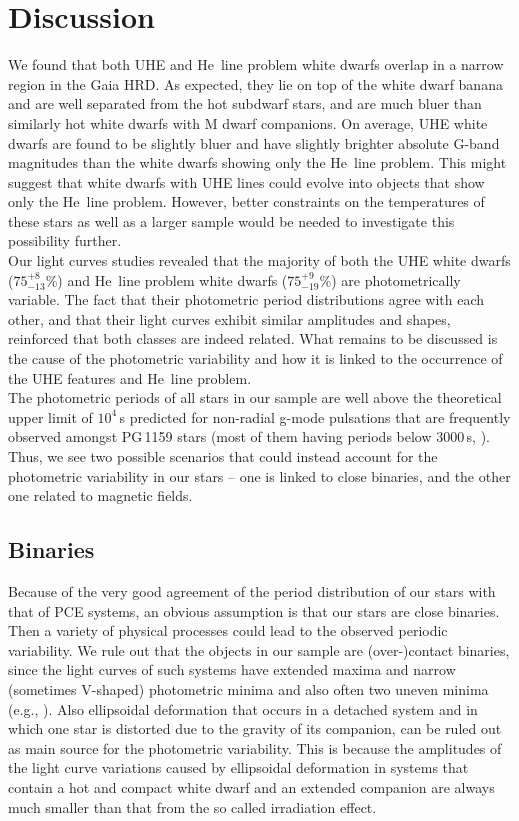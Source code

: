 \documentclass{aa}
\newcounter{Rco}
\newcommand{\Ionst}[1]{\setcounter{Rco}{#1}\Roman{Rco}}
\newcommand{\Ion}[2]{\mbox{#1\,{\scriptsize\Ionst{#2}}}}
\begin{document}
\section{Discussion}
\label{sect:discussion}
 
We found that both UHE and \Ion{He}{2} line problem white dwarfs
overlap in a narrow region in the Gaia HRD. As expected, they lie
on top of the white dwarf banana and are well separated from the
hot subdwarf stars, and are much bluer than similarly hot white dwarfs
with M dwarf companions.
On average, UHE white dwarfs are found to be slightly bluer and have slightly
brighter absolute G-band magnitudes than the white dwarfs showing only the
\Ion{He}{2} line problem. This might suggest that white dwarfs with UHE lines
could evolve into objects that show only the \Ion{He}{2} line problem.
However, better constraints on the temperatures of these stars as well as a
larger sample would be needed to investigate this possibility further.\\
Our light curves studies revealed that the majority of both the UHE
white dwarfs ($75^{+8}_{-13}$\%) and \Ion{He}{2} line problem white dwarfs
($75^{+9}_{-19}$\%) are photometrically variable. The fact that their
photometric period distributions agree with each other, and that their light curves
exhibit similar amplitudes and shapes, reinforced that both classes
are indeed related. What remains to be discussed is the cause of the
photometric variability and how it is linked to the occurrence of the
UHE features and \Ion{He}{2} line problem.\\
The photometric periods of all stars in our sample are well above the
theoretical upper limit of $10^4$\,s predicted for non-radial g-mode
pulsations that are frequently observed amongst PG\,1159 stars (most
of them having periods below 3000\,s,
\citealt{Quirion+2007, Corsico+2019, Corsico+2020}).
Thus, we see two possible scenarios that could instead account
for the photometric variability in our stars -- one is linked to close
binaries, and the other one related to magnetic fields.
 
\subsection{Binaries}
\label{sect:binaries}
 
Because of the very good agreement of the period distribution of
our stars with that of PCE systems, an obvious assumption is that
our stars are close binaries. Then a variety of physical processes
could lead to the observed periodic variability. We rule out that the
objects in our sample are (over-)contact binaries, since the light curves
of such systems have extended maxima and narrow (sometimes V-shaped)
photometric minima and also often two uneven minima
(e.g., \citealt{Miszalski2009, Drake+2014}). Also ellipsoidal deformation that
occurs in a detached system and in which one star is distorted due to the
gravity of its companion, can be ruled out as main source for the photometric
variability. This is because the amplitudes of the light curve variations
caused by ellipsoidal deformation in systems that contain a hot and compact
white dwarf and an extended companion are always much smaller than that from the
so called irradiation effect.
 
\end{document}
